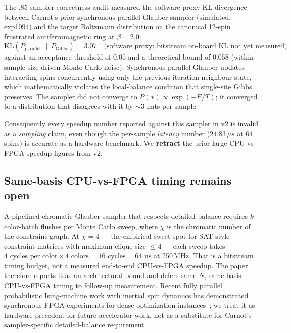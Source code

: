 \documentclass[10pt]{article}
\begin{document}
The .85 sampler-correctness audit measured the software-proxy KL
divergence between Carnot's prior synchronous parallel Glauber
sampler (simulated, exp1094) and the target Boltzmann distribution
on the canonical 12-spin frustrated antiferromagnetic ring at
$\beta = 2.0$:
\begin{equation}
  \mathrm{KL}(P_{\text{parallel}} \,\|\, P_{\text{Gibbs}}) = 3.07
  \quad
  \text{(software proxy; bitstream on-board KL not yet measured)}
\end{equation}
against an acceptance threshold of $0.05$ and a theoretical bound
of $0.058$ (within sample-size-driven Monte Carlo noise).
Synchronous parallel Glauber updates interacting spins concurrently
using only the previous-iteration neighbour state, which
mathematically violates the local-balance condition that single-site
Gibbs preserves. The sampler did not converge to
$P(x) \propto \exp(-E/T)$; it converged to a distribution that
disagrees with it by $\sim 3$ nats per sample.

Consequently every speedup number reported against this sampler in
v2 is invalid as a \emph{sampling} claim, even though the
per-sample \emph{latency} number ($24.83\,\mu s$ at 64 spins) is
accurate as a hardware benchmark. We \textbf{retract} the prior
large CPU-vs-FPGA speedup figures from v2.

\subsection{Same-basis CPU-vs-FPGA timing remains open}

A pipelined chromatic-Glauber sampler that respects detailed
balance requires $k$ color-batch flushes per Monte Carlo sweep,
where $\chi$ is the chromatic number of the constraint graph. At
$\chi = 4$ --- the empirical sweet spot for SAT-style constraint
matrices with maximum clique size $\leq 4$ --- each sweep takes
$4 \text{ cycles per color} \times 4 \text{ colors} = 16
\text{ cycles} = 64 \text{ ns}$ at 250\,MHz. That is a bitstream
timing budget, not a measured end-to-end CPU-vs-FPGA speedup.
The paper therefore reports it as an architectural bound and defers
same-$N$, same-basis CPU-vs-FPGA timing to follow-up measurement.
Recent fully parallel probabilistic Ising-machine work with inertial
spin dynamics has demonstrated synchronous FPGA experiments for dense
optimization instances~\cite{zhu2026parallelisingmachine}; we treat it
as hardware precedent for future accelerator work, not as a substitute
for Carnot's sampler-specific detailed-balance requirement.
\end{document}
